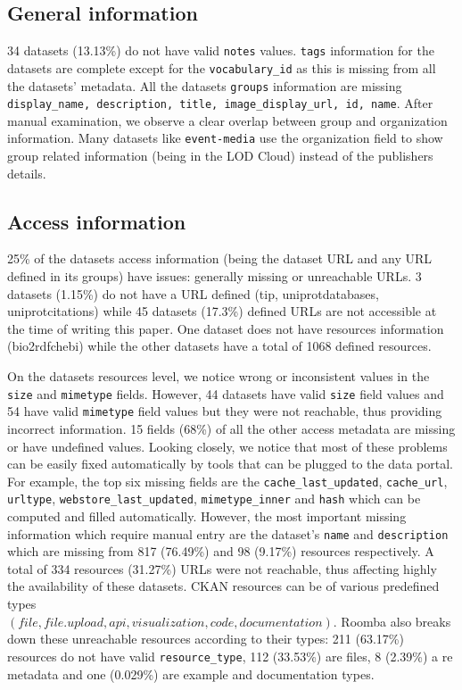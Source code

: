 \subsection{General information}
34 datasets (13.13\%) do not have valid \texttt{notes} values. \texttt{tags} information for the datasets are complete except for the \texttt{vocabulary\_id} as this is missing from all the datasets' metadata. All the datasets \texttt{groups} information are missing \texttt{display\_name, description, title, image\_display\_url, id, name}. After manual examination, we observe a clear overlap between group and organization information. Many datasets like \texttt{event-media} use the organization field to show group related information (being in the LOD Cloud) instead of the publishers details.

\subsection{Access information}
25\% of the datasets access information (being the dataset URL and any URL defined in its groups) have issues: generally missing or unreachable URLs. 3 datasets (1.15\%) do not have a URL defined (tip, uniprot\-databases, uniprot\-citations) while 45 datasets (17.3\%) defined URLs are not accessible at the time of writing this paper. One dataset does not have resources information (bio2rdf\-chebi) while the other datasets have a total of 1068 defined resources.

On the datasets resources level, we notice wrong or inconsistent values in the \texttt{size} and \texttt{mimetype} fields. However, 44 datasets have valid \texttt{size} field values and 54 have valid \texttt{mimetype} field values but they were not reachable, thus providing incorrect information. 15 fields (68\%) of all the other access metadata are missing or have undefined values. Looking closely, we notice that most of these problems can be easily fixed automatically by tools that can be plugged to the data portal. For example, the top six missing fields are the \texttt{cache\_last\_updated}, \texttt{cache\_url}, \texttt{url\-type}, \texttt{webstore\_last\_updated}, \texttt{mimetype\-\_inner} and \texttt{hash} which can be computed and filled automatically. However, the most important missing information which require manual entry are the dataset's \texttt{name} and \texttt{description} which are missing from 817 (76.49\%) and 98 (9.17\%) resources respectively. A total of 334 resources (31.27\%) URLs were not reachable, thus affecting highly the availability of these datasets. CKAN resources can be of various predefined types\\ $(file, file.upload, api, visualization, code, documentation)$. Roomba also breaks down these unreachable resources according to their types: 211 (63.17\%) resources do not have valid \texttt{resource\_type}, 112 (33.53\%) are files, 8 (2.39\%) a re metadata and one (0.029\%) are example and documentation types.

